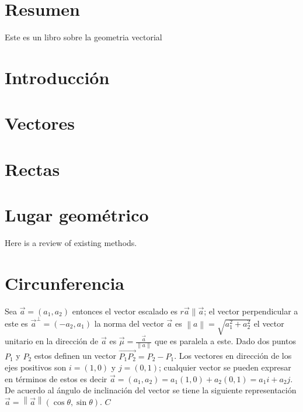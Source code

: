 \documentclass[10pt,]{krantz}
\theoremstyle{definition}
\theoremstyle{definition}
\theoremstyle{definition}
\theoremstyle{remark}
\begin{document}
\hypertarget{resumen}{%
\chapter*{Resumen}\label{resumen}}


Este es un libro sobre la geometria vectorial

\hypertarget{introducciuxf3n}{%
\chapter*{Introducción}\label{introducciuxf3n}}


\mainmatter

\hypertarget{vectores}{%
\chapter{Vectores}\label{vectores}}

\hypertarget{intro}{%
\chapter{Rectas}\label{intro}}

\hypertarget{lugar-geomuxe9trico}{%
\chapter{Lugar geométrico}\label{lugar-geomuxe9trico}}

Here is a review of existing methods.

\hypertarget{circunferencia}{%
\chapter{Circunferencia}\label{circunferencia}}

Sea \(\vec{a}=(a_1,a_2)\) entonces el vector escalado es \(r\vec{a}\parallel\vec{a}\); el vector perpendicular a este es \(\vec{a}^\perp=(-a_2,a_1)\) la norma del vector \(\vec{a}\) es \(\left\|a\right\|=\sqrt{a_1^2+a_2^2}\) el vector unitario en la dirección de \(\vec{a}\) es \(\vec{\mu}=\frac{\vec{a}}{\left\|a\right\|}\) que es paralela a este. Dado dos puntos \(P_1\) y \(P_2\) estos definen un vector \(\vec{P_1P_2}=P_2-P_1\). Los vectores en dirección de los ejes positivos son \(i=(1,0)\) y \(j=(0,1)\); cualquier vector se pueden expresar en términos de estos es decir \(\vec{a}=(a_1,a_2)=a_1(1,0)+a_2(0,1)=a_1i+a_2j\). De acuerdo al ángulo de inclinación del vector se tiene la siguiente representación \(\vec{a}=\left\|\vec{a}\right\|(\cos\theta,\sin\theta)\). \(C\)
\end{document}
